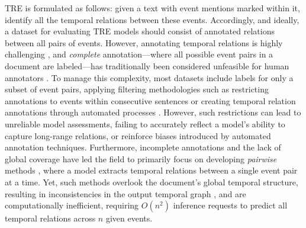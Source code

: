 TRE is formulated as follows: given a text with event mentions marked within it, identify all the temporal relations between these events. Accordingly, and ideally, a dataset for evaluating TRE models should consist of annotated relations between all pairs of events. However, annotating temporal relations is highly challenging \cite{pustejovsky-stubbs-2011-increasing}, and \textit{complete} annotation—where all possible event pairs in a document are labeled—has traditionally been considered unfeasible for human annotators \cite{naik-etal-2019-tddiscourse}. To manage this complexity, most datasets include labels for only a subset of event pairs, applying filtering methodologies such as restricting annotations to events within consecutive sentences \cite{chambers-etal-2014-dense, ning-etal-2018-multi} or creating temporal relation annotations through automated processes \cite{naik-etal-2019-tddiscourse, alsayyahi-batista-navarro-2023-timeline}. 
However, such restrictions can lead to unreliable model assessments, failing to accurately reflect a model’s ability to capture long-range relations, or reinforce biases introduced by automated annotation techniques.
Furthermore, incomplete annotations and the lack of global coverage have led the field to primarily focus on developing \textit{pairwise} methods \cite{wen-ji-2021-utilizing, zhou-etal-2022-rsgt}, where a model extracts temporal relations between a single event pair at a time. 
Yet, such methods overlook the document's global temporal structure, resulting in inconsistencies in the output temporal graph \cite{wang-etal-2020-joint}, and are computationally inefficient, requiring $O(n^2)$ inference requests to predict all temporal relations across $n$ given events.




